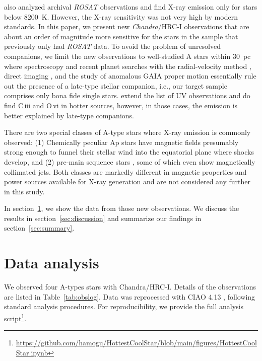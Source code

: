 \documentclass[linenumbers]{aastex631}
\begin{document}
\citet{2002ApJ...579..800S} also analyzed archival \emph{ROSAT} observations
and find X-ray emission only for stars below 8200~K. However, the X-ray sensitivity was not very high by modern standards. 
In this paper, we present new \emph{Chandra}/HRC-I observations that are about an order of magnitude more sensitive for the stars in the \citet{2002ApJ...579..800S} sample that previously only had \emph{ROSAT} data. 
To avoid the problem of unresolved companions, we limit the new observations to well-studied A stars within 30~pc
where spectroscopy and recent planet searches with the radial-velocity method \citep[e.g.][]{2021AJ....161..157H}, direct imaging \citep[e.g.][]{2013ApJ...776....4N,2017AJ....154..245M}, and the study of anomalous GAIA proper motion \citep{2019A&A...623A..72K} essentially rule out the presence of a late-type stellar companion, i.e., our target sample comprises only bona fide single stars.
\citet{2008ApJ...685..478N} extend the list of UV observations and do find  C\,{\sc iii} and O\,{\sc vi} in hotter sources, however, in those cases, the emission is better explained by late-type companions.

There are two special classes of A-type stars where X-ray emission is commonly observed: (1) Chemically peculiar Ap \citep{1997A&A...323..121B,2011A&A...531A..58R} stars have magnetic fields presumably strong enough to funnel their stellar wind into the equatorial plane where shocks develop, and (2) pre-main sequence stars \citep[Herbig Ae stars, e.g.][]{2004ApJ...614..221S,2020ApJ...888...15S,2007A&A...468..541T,2009A&A...494.1041G}, some of which even show magnetically collimated jets. Both classes are markedly different in magnetic properties and power sources available for X-ray generation and are not considered any further in this study.

In section~\ref{sec:data}, we show the data from those new observations. We discuss the results in section~\ref{sec:discussion} and summarize our findings in section~\ref{sec:summary}.


\section{Data analysis} \label{sec:data}
We observed four A-types stars with Chandra/HRC-I. Details of the observations are listed in Table~\ref{tab:obslog}. Data was reprocessed with CIAO 4.13 \citep{2006SPIE.6270E..1VF}, following standard analysis procedures.
For reproducibility, we provide the full analysis script\footnote{\url{https://github.com/hamogu/HottestCoolStar/blob/main/figures/HottestCoolStar.ipynb}}.
\end{document}
